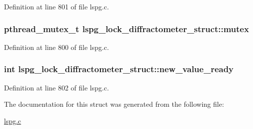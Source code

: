Definition at line 801 of file lspg.c.\hypertarget{structlspg__lock__diffractometer__struct_a362e848dfd1551428b8d12d8776fd2ed}{
\subsubsection[{mutex}]{\setlength{\rightskip}{0pt plus 5cm}pthread\_\-mutex\_\-t {\bf lspg\_\-lock\_\-diffractometer\_\-struct::mutex}}}
\label{structlspg__lock__diffractometer__struct_a362e848dfd1551428b8d12d8776fd2ed}


Definition at line 800 of file lspg.c.\hypertarget{structlspg__lock__diffractometer__struct_ae94acdf44008ce48930e3083f08f5b6c}{
\subsubsection[{new\_\-value\_\-ready}]{\setlength{\rightskip}{0pt plus 5cm}int {\bf lspg\_\-lock\_\-diffractometer\_\-struct::new\_\-value\_\-ready}}}
\label{structlspg__lock__diffractometer__struct_ae94acdf44008ce48930e3083f08f5b6c}


Definition at line 802 of file lspg.c.

The documentation for this struct was generated from the following file:\begin{DoxyCompactItemize}
\item 
\hyperlink{lspg_8c}{lspg.c}\end{DoxyCompactItemize}

